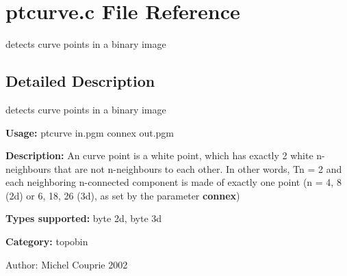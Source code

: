\section{ptcurve.c File Reference}
\label{ptcurve_8c}
detects curve points in a binary image  




\label{_details}
\subsection{Detailed Description}
detects curve points in a binary image 

{\bf Usage:} ptcurve in.pgm connex out.pgm

{\bf Description:} An curve point is a white point, which has exactly 2 white n-neighbours that are not n-neighbours to each other. In other words, Tn = 2 and each neighboring n-connected component is made of exactly one point (n = 4, 8 (2d) or 6, 18, 26 (3d), as set by the parameter {\bf connex})

{\bf Types supported:} byte 2d, byte 3d

{\bf Category:} topobin

\begin{Desc}
\item[Author:]Michel Couprie 2002 \end{Desc}
